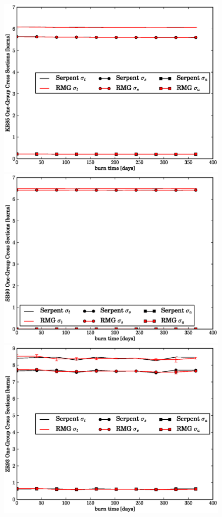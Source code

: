 \begin{figure}[htbp]
\begin{center}
\includegraphics[scale=0.3]{multigroup_method/figs/benchmark/KR85_1g_xs.eps}
\includegraphics[scale=0.3]{multigroup_method/figs/benchmark/SR90_1g_xs.eps}
\includegraphics[scale=0.3]{multigroup_method/figs/benchmark/ZR93_1g_xs.eps}

\end{center}
\end{figure}
